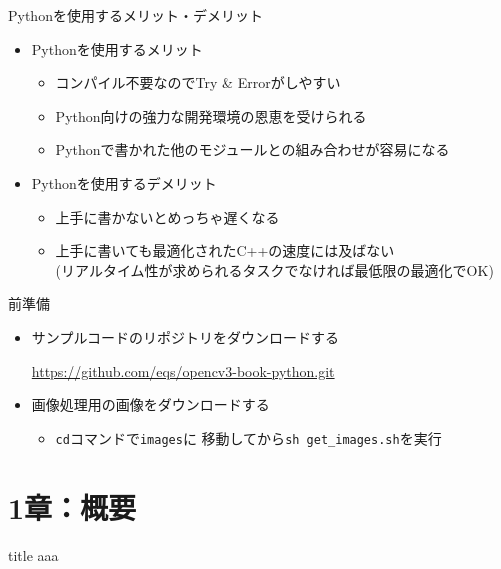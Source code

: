 \documentclass[10pt]{beamer}
\newcommand{\mymain}[1]{\textcolor{mLightBrown}{#1}}
\newcommand{\red}[1]{\textcolor{red}{#1}}
\newcommand{\blue}[1]{\textcolor{blue}{#1}}
\begin{document}
	\begin{frame}{Pythonを使用するメリット・デメリット}
		\begin{itemize}
			\item Pythonを使用するメリット \red{\Smiley[1.5]}
				\begin{itemize}
					\item コンパイル不要なのでTry \& Errorがしやすい
					\item Python向けの強力な開発環境の恩恵を受けられる
					\item Pythonで書かれた他のモジュールとの組み合わせが容易になる
				\end{itemize}
			\item Pythonを使用するデメリット \blue{\Sadey[1.5]}
				\begin{itemize}
					\item 上手に書かないとめっちゃ遅くなる
					\item 上手に書いても最適化されたC++の速度には及ばない \\
						(リアルタイム性が求められるタスクでなければ最低限の最適化でOK)
				\end{itemize}
		\end{itemize}
	\end{frame}

	\begin{frame}[fragile]{前準備}
		\begin{itemize}
			\item サンプルコードのリポジトリをダウンロードする
				\begin{center}
					\url{https://github.com/eqs/opencv3-book-python.git}
				\end{center}
			\item 画像処理用の画像をダウンロードする
				\begin{itemize}
					\item \mymain{\texttt{cd}}コマンドで\mymain{\texttt{images}}に
						移動してから\mymain{\texttt{sh get\_images.sh}}を実行
				\end{itemize}
		\end{itemize}
	\end{frame}

	\section{1章：概要}

	\begin{frame}{title}
		aaa
	\end{frame}
	
\end{document}
